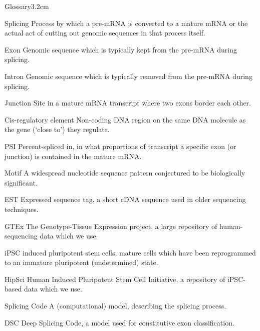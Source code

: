 \begin{mclistof}{Glossary}{3.2cm}
\item[Splicing] Process by which a pre-mRNA is converted to a mature mRNA or the actual act of cutting out genomic sequences in that process itself.
\item[Exon] Genomic sequence which is typically kept from the pre-mRNA during splicing.
\item[Intron] Genomic sequence which is typically removed from the pre-mRNA during splicing.
 \item[Junction] Site in a mature mRNA transcript where two exons border each other.
 \item[Cis-regulatory element] Non-coding DNA region on the same DNA molecule as the gene (`close to') they regulate.
\item[PSI] Percent-spliced in, in what proportions of transcript a specific exon (or junction) is contained in the mature mRNA.
\item[Motif] A widespread nucleotide sequence pattern conjectured to be biologically significant.
\item[EST] Expressed sequence tag, a short cDNA sequence used in older sequencing techniques.
\item[GTEx] The Genotype-Tissue Expression project, a large repository of human-sequencing data which we use.

\item[iPSC] induced pluripotent stem cells, mature cells which have been reprogrammed to an immature pluripotent (undetermined) state.
\item[HipSci] Human Induced Pluripotent Stem Cell Initiative, a repository of iPSC-based data which we use.

\item[Splicing Code] A (computational) model, describing the splicing process.
\item[DSC] Deep Splicing Code, a model used for constitutive exon classification.



\end{mclistof} 
